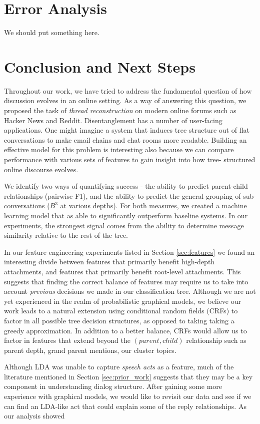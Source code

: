\documentclass{article}
\begin{document}
\section{Error Analysis}
We should put something here.

\section{Conclusion and Next Steps}
Throughout our work, we have tried to address the fundamental question of how
discussion evolves in an online setting. As a way of answering this question,
we proposed the task of \textit{thread reconstruction} on modern online forums
such as Hacker News and Reddit. Disentanglement has a number of user-facing
applications. One might imagine a system that induces tree structure out of
flat conversations to make email chains and chat rooms more readable. Building
an effective model for this problem is interesting also because we can compare
performance with various sets of features to gain insight into how tree-
structured online discourse evolves.

We identify two ways of quantifying success - the ability to
predict parent-child relationships (pairwise F1), and the ability to 
predict the general grouping of sub-conversations ($B^3$ at various depths). For
both measures, we created a machine learning model that as able to significantly 
outperform baseline systems. In our experiments, the strongest signal comes from
the ability to determine message similarity relative to the rest of the tree.

In our feature engineering experiments listed in Section \ref{sec:features} we
found an interesting divide between features that primarily benefit high-depth
attachments, and features that primarily benefit root-level attachments. This
suggests that finding the correct balance of features may require us to take
into account \textit{previous} decisions we made in our classification tree.
Although we are not yet experienced in the realm of probabilistic graphical
models, we believe our work leads to a natural extension using conditional
random fields (CRFs) to factor in all possible tree decision structures, as
opposed to taking taking a greedy approximation. In addition to a better
balance, CRFs would allow us to factor in features that extend beyond the
$(parent,child)$ relationship such as parent depth, grand parent mentions, our
cluster topics.

Although LDA was unable to capture \textit{speech acts} as a feature, much of
the literature mentioned in Section \ref{sec:prior_work} suggests that they
may be a key component in understanding dialog structure. After gaining some
more experience with graphical models, we would like to revisit our data and
see if we can find an LDA-like act that could explain some of the reply
relationships. As our analysis showed
\end{document}
